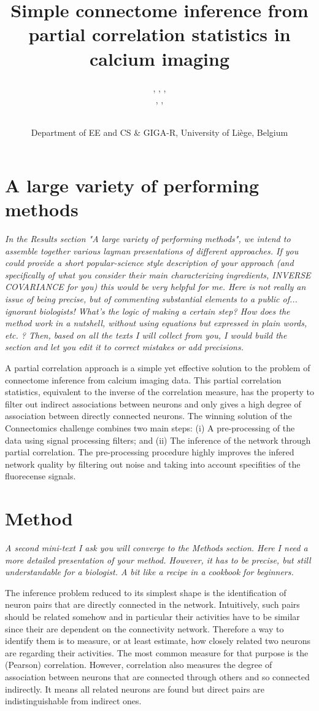 \documentclass[wcp]{jmlr}
\title{Simple connectome inference from partial correlation statistics in calcium imaging}
\author{\Name{Antonio Sutera},
   \Name{Arnaud Joly},
   \Name{Vincent François-Lavet}, \Email{a.sutera@ulg.ac.be}\\
   \Name{Zixiao Aaron Qiu},
   \Name{Gilles Louppe},
   \Name{Damien Ernst}\and\Name{Pierre Geurts}
    \\
   \addr Department of EE and CS \& GIGA-R, University of Li\`ege, Belgium}
\begin{document}
\section{A large variety of performing methods}

\emph{
In the Results section "A large variety of performing methods", we intend to
assemble together various layman presentations of different approaches. If you
could provide a short popular-science style description of your approach (and
specifically of what you consider their main characterizing ingredients,
INVERSE COVARIANCE for you) this would be very helpful for me.  Here is not
really an issue of being precise, but of commenting substantial elements to a
public of... ignorant biologists! What's the logic of making a certain step?
How does the method work in a nutshell, without using equations but expressed
in plain words, etc. ? Then, based on all the texts I will collect from you, I
would build the section and let you edit it to correct mistakes or add
precisions.\\}


A partial correlation approach \cite{sutera2014simple}  is a simple yet
effective solution to the problem of connectome inference from calcium imaging
data. This partial correlation statistics, equivalent to the inverse of the correlation
measure, has  the property to filter out indirect associations between neurons and
only gives a high degree of association between directly connected neurons. The
winning solution of the Connectomics challenge combines two main steps:
(i) A pre-processing of the data using signal processing filters; and (ii)
The inference of the network through partial correlation. The pre-processing procedure
highly improves the infered network quality by filtering out noise and taking into account
specifities of the fluorecense signals.


\section{Method}
\emph{A second mini-text I ask you will converge to the Methods section. Here I need
a more detailed presentation of your method. However, it has to be precise, but
still understandable for a biologist. A bit like a recipe in a cookbook for
beginners.\\}

The inference problem reduced to its simplest shape is the identification of
neuron pairs that are directly connected in the network. Intuitively, such
pairs should be related somehow and in particular their activities have to be
similar since their are dependent on the connectivity network. Therefore a way
to identify them is to measure, or at least estimate, how closely related two
neurons are regarding their activities. The most common measure for that
purpose is the (Pearson) correlation.  However, correlation also measures the
degree of association between neurons that are connected through others and so
connected indirectly. It means all related neurons are found but direct pairs
are indistinguishable from indirect ones.
\end{document}
